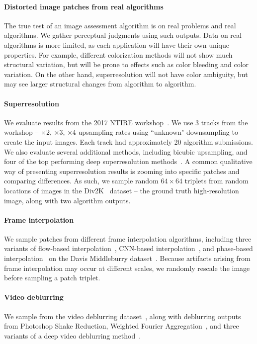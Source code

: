 \paragraph{Distorted image patches from real algorithms}
The true test of an image assessment algorithm is on real problems and real algorithms. 
We gather perceptual judgments using such outputs. Data on real algorithms is more limited, as each application will have their own unique properties. For example, different colorization methods will not show much structural variation, but will be prone to effects such as color bleeding and color variation. On the other hand, superresolution will not have color ambiguity, but may see larger structural changes from algorithm to algorithm.

\paragraph{Superresolution} We evaluate results from the 2017 NTIRE workshop~\cite{Agustsson_2017_CVPR_Workshops}. We use 3 tracks from the workshop -- $\times2$, $\times3$, $\times4$ upsampling rates using ``unknown" downsampling to create the input images. Each track had approximately 20 algorithm submissions. We also evaluate several additional methods, including bicubic upsampling, and four of the top performing deep superresolution methods~\cite{kim2016accurate,wang2015deep,ledig2016photo,sajjadi2016enhancenet}. A common qualitative way of presenting superresolution results is zooming into specific patches and comparing differences. As such, we sample random $64\times 64$ triplets from random locations of images in the Div2K~\cite{Agustsson_2017_CVPR_Workshops} dataset -- the ground truth high-resolution image, along with two algorithm outputs.

\paragraph{Frame interpolation} We sample patches from different frame interpolation algorithms, including three variants of flow-based interpolation~\cite{liu2009beyond}, CNN-based interpolation~\cite{Niklaus_ICCV_2017}, and phase-based interpolation~\cite{meyer2015phase} on the Davis Middleburry dataset~\cite{scharstein2002taxonomy}. Because artifacts arising from frame interpolation may occur at different scales, we randomly rescale the image before sampling a patch triplet.

\paragraph{Video deblurring} We sample from the video deblurring dataset~\cite{Su_2017_CVPR}, along with deblurring outputs from Photoshop Shake Reduction, Weighted Fourier Aggregation~\cite{delbracio2015hand}, and three variants of a deep video deblurring method~\cite{Su_2017_CVPR}.

